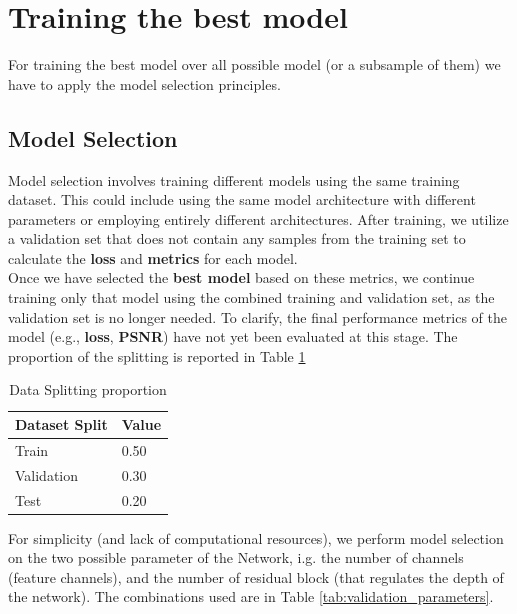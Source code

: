 \documentclass[../report.tex]{subfiles}
\begin{document}
\section{Training the best model}
For training the best model over all possible model (or a subsample of them) we have to apply the model selection principles.
\subsection{Model Selection}

Model selection involves training different models using the same training dataset. This could include using the same model architecture with different parameters or employing entirely different architectures. After training, we utilize a validation set that does not contain any samples from the training set to calculate the \textbf{loss} and \textbf{metrics} for each model.\\
Once we have selected the \textbf{best model} based on these metrics, we continue training only that model using the combined training and validation set, as the validation set is no longer needed. To clarify, the final performance metrics of the model (e.g., \textbf{loss}, \textbf{PSNR}) have not yet been evaluated at this stage.
The proportion of the splitting is reported in Table \ref{tab:data_splitting}

\begin{table}[h]
	\centering
	\caption{Data Splitting proportion}
	\begin{tabular}{@{}ll@{}}
		\toprule
		\textbf{Dataset Split} & \textbf{Value} \\ \midrule
		Train       & 0.50 \\ 
		Validation  & 0.30 \\ 
		Test        & 0.20 \\ 
		\bottomrule
	\end{tabular}
	\label{tab:data_splitting}
\end{table}

For simplicity (and lack of computational resources), we perform model selection on the two possible parameter of the Network, i.g. the number of channels (feature channels), and the number of residual block (that regulates the depth of the network). The combinations used are in Table \ref{tab:validation_parameters}.
\end{document}
